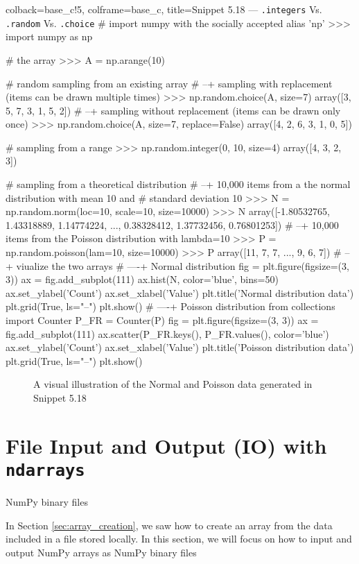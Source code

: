 \documentclass[a4paper,11pt]{book}
\numberwithin{figure}{chapter}
\numberwithin{table}{chapter}
\newcommand{\question}[1]{%
    \begin{tcolorbox}[colback=comp_c!10,colframe=comp_c,sidebyside align=top,width=\linewidth,before skip=1ex]
        #1
    \end{tcolorbox}
    \switchcolumn%
}
\newcommand{\note}[1]{%
    \begin{tcolorbox}[colback=white!0,colframe=white!10,width=\linewidth,before skip=1ex]
        #1
    \end{tcolorbox}
}
\begin{document}
\begin{pythoncode}[linenos=true,]{colback=base_c!5, colframe=base_c, title=\sffamily Snippet 5.18 --- \texttt{.integers} Vs. \texttt{.random} Vs. \texttt{.choice}}
# import numpy with the socially accepted alias 'np'
>>> import numpy as np

# the array
>>> A = np.arange(10)

# random sampling from an existing array
# --+ sampling with replacement (items can be drawn multiple times)
>>> np.random.choice(A, size=7)
array([3, 5, 7, 3, 1, 5, 2])
# --+ sampling without replacement (items can be drawn only once)
>>> np.random.choice(A, size=7, replace=False)
array([4, 2, 6, 3, 1, 0, 5])

# sampling from a range
>>> np.random.integer(0, 10, size=4)
array([4, 3, 2, 3])

# sampling from a theoretical distribution
# --+ 10,000 items from a the normal distribution with mean 10 and 
# standard deviation 10
>>> N = np.random.norm(loc=10, scale=10, size=10000)
>>> N
array([-1.80532765,  1.43318889,  1.14774224, ...,  0.38328412,
        1.37732456,  0.76801253])
# --+ 10,000 items from the Poisson distribution with lambda=10
>>> P = np.random.poisson(lam=10, size=10000)
>>> P
array([11,  7,  7, ...,  9,  6,  7])
# --+ viualize the two arrays
# ----+ Normal distribution
fig = plt.figure(figsize=(3, 3))
ax = fig.add_subplot(111)
ax.hist(N, color='blue', bins=50)
ax.set_ylabel('Count')
ax.set_xlabel('Value')
plt.title('Normal distribution data')
plt.grid(True,  ls="--")
plt.show()
# ----+ Poisson distribution
from collections import Counter
P_FR = Counter(P)
fig = plt.figure(figsize=(3, 3))
ax = fig.add_subplot(111)
ax.scatter(P_FR.keys(), P_FR.values(), color='blue')
ax.set_ylabel('Count')
ax.set_xlabel('Value')
plt.title('Poisson distribution data')
plt.grid(True, ls="--")
plt.show()
\end{pythoncode}

\begin{figure}[!htbp]
	\centering
	
	
	\caption{A visual illustration of the Normal and Poisson data generated in Snippet 5.18}
	\label{fig:normal_and_poisson_distros}
\end{figure}


\section{File Input and Output (IO) with \texttt{ndarrays}}

\begin{paracol}{2}
	\question{\raggedright NumPy binary files}
	\note{In Section \ref{sec:array_creation}, we saw how to create an array from the data included in a file stored locally. In this section, we will focus on how to input and output NumPy arrays as NumPy binary files}
\end{paracol}
\end{document}
